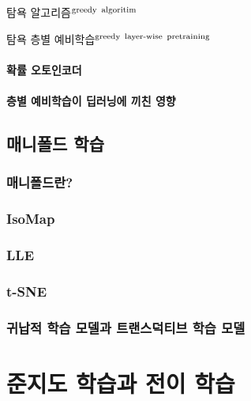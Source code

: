 \documentclass [12pt] {oblivoir}
\let\oldsubsubsection=\subsubsection
\renewcommand{\subsubsection}
{
  \filbreak
  \oldsubsubsection
}
\begin{document}
탐욕 알고리즘$^{\text{greedy\, algoritim}}$

탐욕 층별 예비학습$^{\text{greedy\, layer-wise\, pretraining}}$

\vspace{3mm}

\paragraph*{확률 오토인코더}\mbox{}

\vspace{3mm}

\paragraph*{층별 예비학습이 딥러닝에 끼친 영향}\mbox{}

\vspace{3mm}

\subsection{매니폴드 학습}

\subsubsection{매니폴드란?}

\subsubsection{IsoMap}

\subsubsection{LLE}

\subsubsection{t-SNE}

\subsubsection{귀납적 학습 모델과 트랜스덕티브 학습 모델}

\newpage
\section{준지도 학습과 전이 학습}
\end{document}
